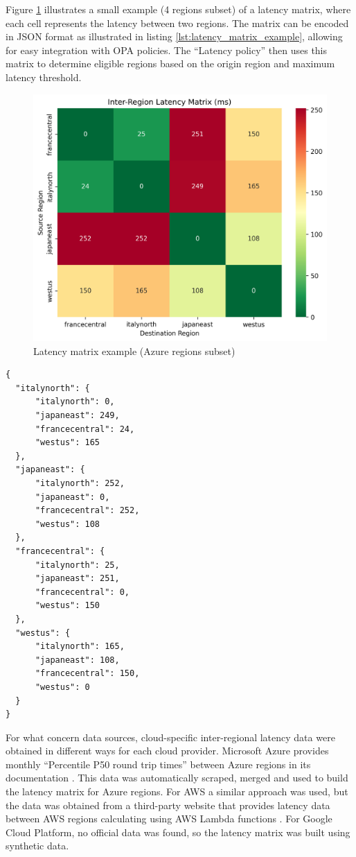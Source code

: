 Figure \ref{fig:latency_matrix} illustrates a small example (4 regions subset) of a latency matrix, where each cell represents the latency between two regions. The matrix can be encoded in JSON format as illustrated in listing \ref{lst:latency_matrix_example}, allowing for easy integration with OPA policies. The ``Latency policy'' then uses this matrix to determine eligible regions based on the origin region and maximum latency threshold.

\begin{figure}[t]
  \centering
  \includegraphics[width=0.575\linewidth]{images/latency_heatmap.png}
  \caption{Latency matrix example (Azure regions subset)}
  \label{fig:latency_matrix}
\end{figure}

\lstset{style=jsonstyle}
\begin{lstlisting}[caption={Latancy matrix example encoded in JSON format}, label={lst:latency_matrix_example}]
{
  "italynorth": {
      "italynorth": 0,
      "japaneast": 249,
      "francecentral": 24,
      "westus": 165
  },
  "japaneast": {
      "italynorth": 252,
      "japaneast": 0,
      "francecentral": 252,
      "westus": 108
  },
  "francecentral": {
      "italynorth": 25,
      "japaneast": 251,
      "francecentral": 0,
      "westus": 150
  },
  "westus": {
      "italynorth": 165,
      "japaneast": 108,
      "francecentral": 150,
      "westus": 0
  }
}

\end{lstlisting}

For what concern data sources, cloud-specific inter-regional latency data were obtained in different ways for each cloud provider.
Microsoft Azure provides monthly ``Percentile P50 round trip times'' between Azure regions in its documentation \cite{azure_network_latency}. 
This data was automatically scraped, merged and used to build the latency matrix for Azure regions.
For AWS a similar approach was used, but the data was obtained from a third-party website that provides latency data between AWS regions calculating using AWS Lambda functions \cite{cloudping}.
For Google Cloud Platform, no official data was found, so the latency matrix was built using synthetic data.

